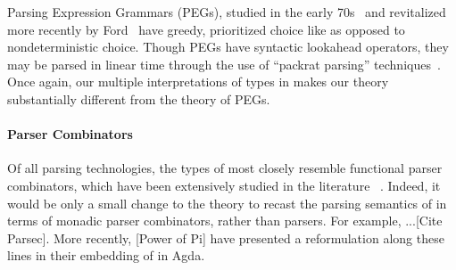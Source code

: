 Parsing Expression Grammars (PEGs), studied in the early
70s~\cite{birman+:parsing} and revitalized more recently by
Ford~\cite{ford:pegs} have greedy, prioritized choice like \ddc{} as opposed to
nondeterministic choice.  Though PEGs have syntactic lookahead
operators, they may be parsed in linear time through the use of
``packrat parsing'' techniques~\cite{ford:packrat,grimm:packrat}.
Once again, our multiple interpretations of types in \ddc{} makes our
theory substantially different from the theory of PEGs.


\paragraph*{Parser Combinators}

Of all parsing technologies, the types of \ddc{} most closely resemble functional parser combinators, which have been extensively studied in the literature ~\cite{burge:parser-combinators,hutton+:parser-combinators}. Indeed, it would be only a small change to the \ddc{} theory to recast the parsing semantics of \ddc{} in terms of monadic parser combinators, rather than parsers. For example, ...[Cite Parsec]. More recently, [Power of Pi] have presented a reformulation along these lines in their embedding of \ddc{} in Agda.

